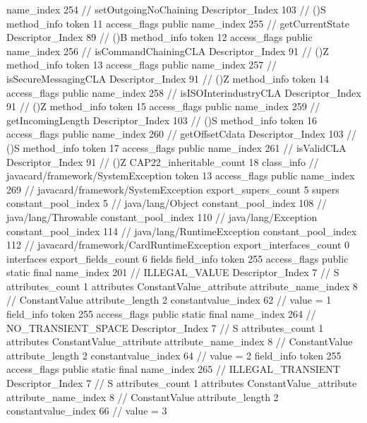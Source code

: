 {{{{{					name_index	254		// setOutgoingNoChaining
					Descriptor_Index	103		// ()S
				}
				method_info {
					token	11
					access_flags	public
					name_index	255		// getCurrentState
					Descriptor_Index	89		// ()B
				}
				method_info {
					token	12
					access_flags	public
					name_index	256		// isCommandChainingCLA
					Descriptor_Index	91		// ()Z
				}
				method_info {
					token	13
					access_flags	public
					name_index	257		// isSecureMessagingCLA
					Descriptor_Index	91		// ()Z
				}
				method_info {
					token	14
					access_flags	public
					name_index	258		// isISOInterindustryCLA
					Descriptor_Index	91		// ()Z
				}
				method_info {
					token	15
					access_flags	public
					name_index	259		// getIncomingLength
					Descriptor_Index	103		// ()S
				}
				method_info {
					token	16
					access_flags	public
					name_index	260		// getOffsetCdata
					Descriptor_Index	103		// ()S
				}
				method_info {
					token	17
					access_flags	public
					name_index	261		// isValidCLA
					Descriptor_Index	91		// ()Z
				}
			}
			CAP22_inheritable_count	18
		}
		class_info {		// javacard/framework/SystemException
			token	13
			access_flags	public
			name_index	269		// javacard/framework/SystemException
			export_supers_count	5
			supers {
				constant_pool_index	5		// java/lang/Object
				constant_pool_index	108		// java/lang/Throwable
				constant_pool_index	110		// java/lang/Exception
				constant_pool_index	114		// java/lang/RuntimeException
				constant_pool_index	112		// javacard/framework/CardRuntimeException
			}
			export_interfaces_count	0
			interfaces {
			}
			export_fields_count	6
			fields {
			field_info {
				token	255
				access_flags	public static final
				name_index	201		// ILLEGAL_VALUE
				Descriptor_Index	7		// S
				attributes_count	1
				attributes {
				ConstantValue_attribute {
					attribute_name_index	8		// ConstantValue
					attribute_length	2
					constantvalue_index	62		// value = 1
				}
				}
			}
			field_info {
				token	255
				access_flags	public static final
				name_index	264		// NO_TRANSIENT_SPACE
				Descriptor_Index	7		// S
				attributes_count	1
				attributes {
				ConstantValue_attribute {
					attribute_name_index	8		// ConstantValue
					attribute_length	2
					constantvalue_index	64		// value = 2
				}
				}
			}
			field_info {
				token	255
				access_flags	public static final
				name_index	265		// ILLEGAL_TRANSIENT
				Descriptor_Index	7		// S
				attributes_count	1
				attributes {
				ConstantValue_attribute {
					attribute_name_index	8		// ConstantValue
					attribute_length	2
					constantvalue_index	66		// value = 3
}}}}}}}
